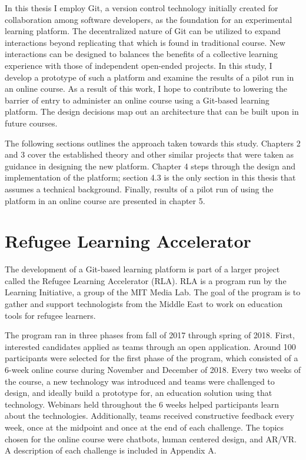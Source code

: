 \documentclass[12pt,twoside,vi]{mitthesis}
\begin{document}
In this thesis I employ Git, a version control technology initially created for collaboration among software developers, as the foundation for an experimental learning platform. The decentralized nature of Git can be utilized to expand interactions beyond replicating that which is found in traditional course. New interactions can be designed to balances the benefits of a collective learning experience with those of independent open-ended projects. In this study, I develop a prototype of such a platform and examine the results of a pilot run in an online course. As a result of this work, I hope to contribute to lowering the barrier of entry to administer an online course using a Git-based learning platform. The design decisions map out an architecture that can be built upon in future courses. 

The following sections outlines the approach taken towards this study. Chapters 2 and 3 cover the established theory and other similar projects that were taken as guidance in designing the new platform. Chapter 4 steps through the design and implementation of the platform; section 4.3 is the only section in this thesis that assumes a technical background. Finally, results of a pilot run of using the platform in an online course are presented in chapter 5. 

\section{Refugee Learning Accelerator}

The development of a Git-based learning platform is part of a larger project called the Refugee Learning Accelerator (RLA). RLA is a program run by the Learning Initiative, a group of the MIT Media Lab. The goal of the program is to gather and support technologists from the Middle East to work on education tools for refugee learners. 

The program ran in three phases from fall of 2017 through spring of 2018. First, interested candidates applied as teams through an open application. Around 100 participants were selected for the first phase of the program, which consisted of a 6-week online course during November and December of 2018. Every two weeks of the course, a new technology was introduced and teams were challenged to design, and ideally build a prototype for, an education solution using that technology. Webinars held throughout the 6 weeks helped participants learn about the technologies. Additionally, teams received constructive feedback every week, once at the midpoint and once at the end of each challenge. The topics chosen for the online course were chatbots, human centered design, and AR/VR. A description of each challenge is included in Appendix A.
\end{document}
